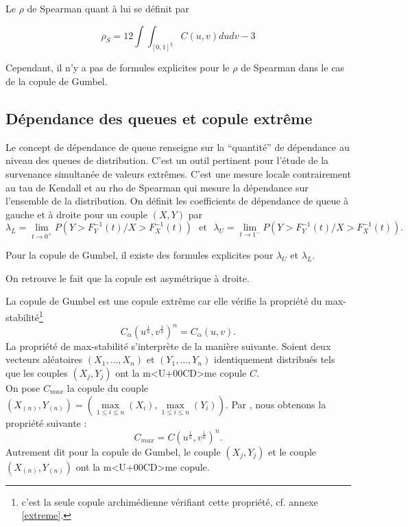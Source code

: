 \documentclass[11pt,a4paper]{article}
\newcommand{\txtm}[1]{\textrm{~~#1~~}}
\begin{document}
Le $\rho$ de Spearman quant \`a lui se d\'efinit par

$$\rho_S = 12\int\!\!\!\!\int_{[0,1]^2}C(u,v)dudv-3$$

Cependant, il n'y a pas de formules explicites pour le $\rho$ de Spearman dans le cas de la copule de Gumbel.

\subsection{D\'ependance des queues et copule extr\^eme}
\label{dependance}
Le concept de d\'ependance de queue renseigne sur la ``quantit\'e'' de d\'e\-pen\-dance 
au niveau des queues de distribution. C'est un outil pertinent pour l'\'etude de la survenance simultan\'ee de valeurs extr\^emes.
C'est une mesure locale contrairement au tau de Kendall et au rho de Spearman qui mesure la d\'ependance sur l'ensemble de la distribution.
On d\'efinit les coefficients de d\'ependance de queue \`a gauche et \`a droite pour un couple $(X,Y)$ par
$$
\lambda_L = \underset{t\rightarrow0^+}{\lim} P(Y > F_Y^{-1}(t) / X > F_X^{-1}(t)) \txtm{et} \lambda_U = \underset{t\rightarrow1^-}{\lim} P(Y > F_Y^{-1}(t) / X > F_X^{-1}(t)).
$$

\medskip
Pour la copule de Gumbel, il existe des formules explicites pour $\lambda_U$ et $\lambda_L$.
\begin{center}
\fbox{$ \lambda_L = 0 \txtm{et} \lambda_U = 2-2^{\frac{1}{\alpha}}. $}
\end{center}
On retrouve le fait que la copule est asym\'etrique \`a droite.

\medskip


La copule de Gumbel est une copule extr\^eme car elle v\'erifie la propri\'et\'e du 
max-stabilit\'e\footnote{c'est la seule copule archim\'edienne v\'erifiant cette propri\'et\'e, cf. annexe \ref{extreme}.} 
$$
C_\alpha\left(u^{\frac{1}{n}},v^{\frac{1}{n}}\right)^n = C_\alpha(u,v).
$$
La propri\'et\'e de max-stabilit\'e s'interpr\`ete de la mani\`ere suivante. Soient deux vecteurs
al\'eatoires $(X_1,\dots,X_n)$ et $(Y_1,\dots,Y_n)$ identiquement distribu\'es tels que 
les couples $(X_j, Y_j)$ ont la m<U+00CD>me copule $C$. \\
On pose $C_{max}$ la copule du couple 
$(X_{(n)},Y_{(n)}) = (\underset{1\leq i\leq n}{\max}(X_i), \underset{1\leq i\leq n}{\max}(Y_i))$.
Par \cite{nelsen2}, nous obtenons la propri\'et\'e suivante :
$$
C_{max} = C\left(u^{\frac{1}{n}},v^{\frac{1}{n}}\right)^n.
$$
Autrement dit pour la copule de Gumbel, le couple $(X_j, Y_j)$ et le couple 
$(X_{(n)},Y_{(n)})$ ont la m<U+00CD>me copule.
\end{document}
